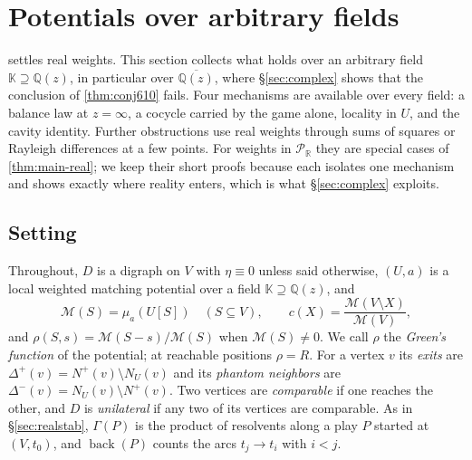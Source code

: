 \documentclass[final]{siamart0516}
\numberwithin{theorem}{section}
\numberwithin{equation}{section}
\theoremstyle{siamnonum}
\theoremstyle{plain}
\newcommand{\QQ}{\mathbb{Q}}
\newcommand{\RR}{\mathbb{R}}
\newcommand{\Qz}{\QQ(z)}
\newcommand{\Qzbar}{\overline{\QQ(z)}}
\newcommand{\Puis}{\mathcal{P}_{\RR}}
\newcommand{\Mpot}{\mathcal{M}}           %
\newcommand{\back}{\operatorname{back}}
\newcommand{\nplus}{N^{+}}
\begin{document}
\section{Potentials over arbitrary fields}\label{sec:fields}

 settles real weights. This section collects what holds over an arbitrary field $\mathbb K\supseteq\Qz$, in particular over $\Qzbar$, where \S\ref{sec:complex} shows that the conclusion of \cref{thm:conj610} fails. Four mechanisms are available over every field: a balance law at $z=\infty$, a cocycle carried by the game alone, locality in $U$, and the cavity identity. Further obstructions use real weights through sums of squares or Rayleigh differences at a few points. For weights in $\Puis$ they are special cases of \cref{thm:main-real}; we keep their short proofs because each isolates one mechanism and shows exactly where reality enters, which is what \S\ref{sec:complex} exploits.

\subsection{Setting}\label{ssec:fields-setting}
Throughout, $D$ is a digraph on $V$ with $\eta\equiv0$ unless said otherwise, $(U,a)$ is a local weighted matching potential over a field $\mathbb K\supseteq\Qz$, and
\[
\Mpot(S)=\mu_a(U[S])\quad(S\subseteq V),\qquad c(X)=\frac{\Mpot(V\setminus X)}{\Mpot(V)},
\]
and $\rho(S,s)=\Mpot(S-s)/\Mpot(S)$ when $\Mpot(S)\neq0$.
We call $\rho$ the \emph{Green's function} of the potential; at reachable positions $\rho=R$. For a vertex $v$ its \emph{exits} are $\Delta^{+}(v)=\nplus(v)\setminus N_U(v)$ and its \emph{phantom neighbors} are $\Delta^{-}(v)=N_U(v)\setminus\nplus(v)$. Two vertices are \emph{comparable} if one reaches the other, and $D$ is \emph{unilateral} if any two of its vertices are comparable. As in \S\ref{sec:realstab}, $\Gamma(P)$ is the product of resolvents along a play $P$ started at $(V,t_0)$, and $\back(P)$ counts the arcs $t_j\to t_i$ with $i<j$.
\end{document}
